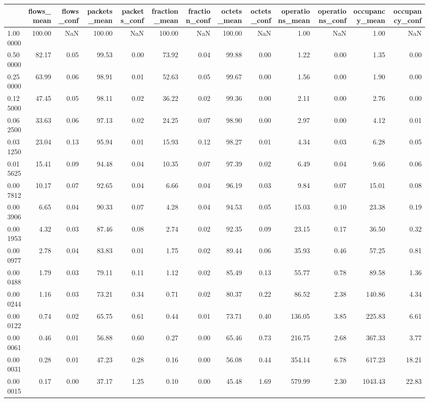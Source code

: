 \begin{tabular}{lrrrrrrrrrrrr}
\toprule
 & flows_mean & flows_conf & packets_mean & packets_conf & fraction_mean & fraction_conf & octets_mean & octets_conf & operations_mean & operations_conf & occupancy_mean & occupancy_conf \\
\midrule
1.000000 & 100.00 & NaN & 100.00 & NaN & 100.00 & NaN & 100.00 & NaN & 1.00 & NaN & 1.00 & NaN \\
0.500000 & 82.17 & 0.05 & 99.53 & 0.00 & 73.92 & 0.04 & 99.88 & 0.00 & 1.22 & 0.00 & 1.35 & 0.00 \\
0.250000 & 63.99 & 0.06 & 98.91 & 0.01 & 52.63 & 0.05 & 99.67 & 0.00 & 1.56 & 0.00 & 1.90 & 0.00 \\
0.125000 & 47.45 & 0.05 & 98.11 & 0.02 & 36.22 & 0.02 & 99.36 & 0.00 & 2.11 & 0.00 & 2.76 & 0.00 \\
0.062500 & 33.63 & 0.06 & 97.13 & 0.02 & 24.25 & 0.07 & 98.90 & 0.00 & 2.97 & 0.00 & 4.12 & 0.01 \\
0.031250 & 23.04 & 0.13 & 95.94 & 0.01 & 15.93 & 0.12 & 98.27 & 0.01 & 4.34 & 0.03 & 6.28 & 0.05 \\
0.015625 & 15.41 & 0.09 & 94.48 & 0.04 & 10.35 & 0.07 & 97.39 & 0.02 & 6.49 & 0.04 & 9.66 & 0.06 \\
0.007812 & 10.17 & 0.07 & 92.65 & 0.04 & 6.66 & 0.04 & 96.19 & 0.03 & 9.84 & 0.07 & 15.01 & 0.08 \\
0.003906 & 6.65 & 0.04 & 90.33 & 0.07 & 4.28 & 0.04 & 94.53 & 0.05 & 15.03 & 0.10 & 23.38 & 0.19 \\
0.001953 & 4.32 & 0.03 & 87.46 & 0.08 & 2.74 & 0.02 & 92.35 & 0.09 & 23.15 & 0.17 & 36.50 & 0.32 \\
0.000977 & 2.78 & 0.04 & 83.83 & 0.01 & 1.75 & 0.02 & 89.44 & 0.06 & 35.93 & 0.46 & 57.25 & 0.81 \\
0.000488 & 1.79 & 0.03 & 79.11 & 0.11 & 1.12 & 0.02 & 85.49 & 0.13 & 55.77 & 0.78 & 89.58 & 1.36 \\
0.000244 & 1.16 & 0.03 & 73.21 & 0.34 & 0.71 & 0.02 & 80.37 & 0.22 & 86.52 & 2.38 & 140.86 & 4.34 \\
0.000122 & 0.74 & 0.02 & 65.75 & 0.61 & 0.44 & 0.01 & 73.71 & 0.40 & 136.05 & 3.85 & 225.83 & 6.61 \\
0.000061 & 0.46 & 0.01 & 56.88 & 0.60 & 0.27 & 0.00 & 65.46 & 0.73 & 216.75 & 2.68 & 367.33 & 3.77 \\
0.000031 & 0.28 & 0.01 & 47.23 & 0.28 & 0.16 & 0.00 & 56.08 & 0.44 & 354.14 & 6.78 & 617.23 & 18.21 \\
0.000015 & 0.17 & 0.00 & 37.17 & 1.25 & 0.10 & 0.00 & 45.48 & 1.69 & 579.99 & 2.30 & 1043.43 & 22.83 \\

\end{tabular}

